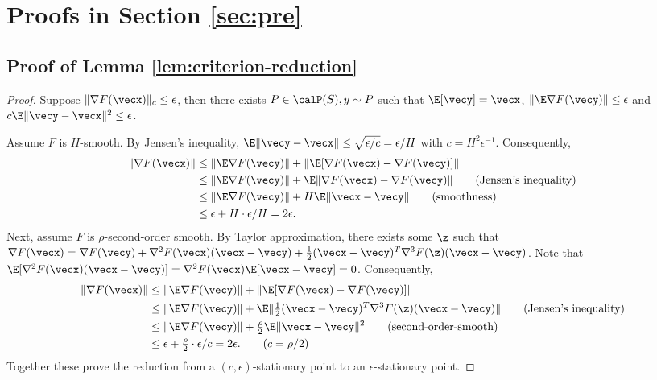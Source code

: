 \section{Proofs in Section \ref{sec:pre}}
\label{app:pre}

\subsection{Proof of Lemma \ref{lem:criterion-reduction}}

\CriterionReduction*

\begin{proof}
Suppose $\|\nabla F(\vecx)\|_c \le \epsilon$, then there exists $P\in\calP(S), y\sim P$ such that $\E[\vecy]=\vecx$, $\|\E \nabla F(\vecy)\| \le \epsilon$ and $c\E\|\vecy-\vecx\|^2 \le \epsilon$. 

Assume $F$ is $H$-smooth. By Jensen's inequality, $\E\|\vecy-\vecx\| \le \sqrt{\epsilon/c} = \epsilon/H$ with $c=H^2\epsilon^{-1}$. Consequently,
\begin{align*}
    \|\nabla F(\vecx)\|
    &\le \|\E\nabla F(\vecy)\| + \|\E[\nabla F(\vecx) - \nabla F(\vecy)]\| \\
    &\le \|\E\nabla F(\vecy)\| + \E\|\nabla F(\vecx) - \nabla F(\vecy)\| \tag{Jensen's inequality}\\
    &\le \|\E\nabla F(\vecy)\| + H\E\|\vecx-\vecy\| \tag{smoothness}\\
    &\le \epsilon + H \cdot \epsilon/H = 2\epsilon. 
\end{align*}
Next, assume $F$ is $\rho$-second-order smooth. By Taylor approximation, there exists some $\z$ such that $\nabla F(\vecx) = \nabla F(\vecy) + \nabla^2F(\vecx)(\vecx-\vecy) + \frac{1}{2}(\vecx-\vecy)^T\nabla^3F(\z)(\vecx-\vecy)$. Note that $\E[\nabla^2F(\vecx)(\vecx-\vecy)]=\nabla^2F(\vecx)\E[\vecx-\vecy]=0$. Consequently,
\begin{align*}
    \|\nabla F(\vecx)\|
    &\le \|\E\nabla F(\vecy)\| + \|\E[\nabla F(\vecx)-\nabla F(\vecy)]\| \\
    &\le \|\E\nabla F(\vecy)\| + \E\|\tfrac{1}{2}(\vecx-\vecy)^T\nabla^3F(\z)(\vecx-\vecy)\| \tag{Jensen's inequality}\\
    &\le \|\E\nabla F(\vecy)\| + \tfrac{\rho}{2} \E\|\vecx-\vecy\|^2 \tag{second-order-smooth}\\
    &\le \epsilon + \tfrac{\rho}{2}\cdot \epsilon/c = 2\epsilon. \tag{$c=\rho/2$}
\end{align*}
Together these prove the reduction from a $(c,\epsilon)$-stationary point to an $\epsilon$-stationary point.
\end{proof}


